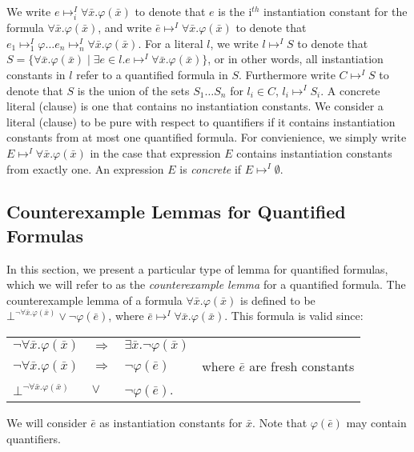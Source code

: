 \documentclass{llncs}
\begin{document}
We write $e \mapsto^I_i \forall \bar{x}. \varphi( \bar{x} )$ to denote that $e$ is the i$^{th}$ instantiation constant for the formula $\forall \bar{x}. \varphi( \bar{x} ) $, and write $\bar{e} \mapsto^I \forall \bar{x}. \varphi( \bar{x} )$ to denote that $e_1 \mapsto^I_1 \varphi \ldots e_n \mapsto^I_n \forall \bar{x}. \varphi( \bar{x} )$.
For a literal $l$, we write $l \mapsto^I S$ to denote that $S = \{ \forall \bar{x}. \varphi( \bar{x} ) \mid \exists e \in l. e \mapsto^I \forall \bar{x}. \varphi( \bar{x} ) \}$, or in other words, all instantiation constants in $l$ refer to a quantified formula in $S$.
Furthermore write $C \mapsto^I S$ to denote that $S$ is the union of the sets $S_1 \ldots S_n$ for $l_i \in C$, $l_i \mapsto^I S_i$.
A concrete literal (clause) is one that contains no instantiation constants.
We consider a literal (clause) to be pure with respect to quantifiers if it contains instantiation constants from at most one quantified formula.
For convienience, we simply write $E \mapsto^I \forall \bar{x}. \varphi( \bar{x} )$ in the case that expression $E$ contains instantiation constants from exactly one.
An expression $E$ is \emph{concrete} if $E \mapsto^I \emptyset$.

\subsection{Counterexample Lemmas for Quantified Formulas}
\label{sec:CENF}

In this section, we present a particular type of lemma for quantified formulas, which we will refer to as the \emph{counterexample lemma} for a quantified formula.
The counterexample lemma of a formula $\forall \bar{x}. \varphi( \bar{ x } )$ is defined to be $\bot^{\neg \forall \bar{x}. \varphi( \bar{x} )} \vee \neg \varphi( \bar{e} )$, where $\bar{e} \mapsto^I \forall \bar{x}. \varphi( \bar{x} )$.
This formula is valid since:

\begin{tabular}{llll}
$\neg \forall \bar{x}. \varphi( \bar{ x } )$ & $\Rightarrow$ & $\exists \bar{x}. \neg \varphi( \bar{x} )$ \\
$\neg \forall \bar{x}. \varphi( \bar{ x } )$ & $\Rightarrow$ & $\neg \varphi( \bar{e} )$  & where $\bar{e}$ are fresh constants \\
$\bot^{\neg \forall \bar{x}. \varphi( \bar{x} )}$ & $\vee$ & $\neg \varphi( \bar{e} )$. \\
\end{tabular}

We will consider $\bar{e}$ as instantiation constants for $\bar{x}$.
Note that $\varphi(\bar{e})$ may contain quantifiers.
\end{document}
